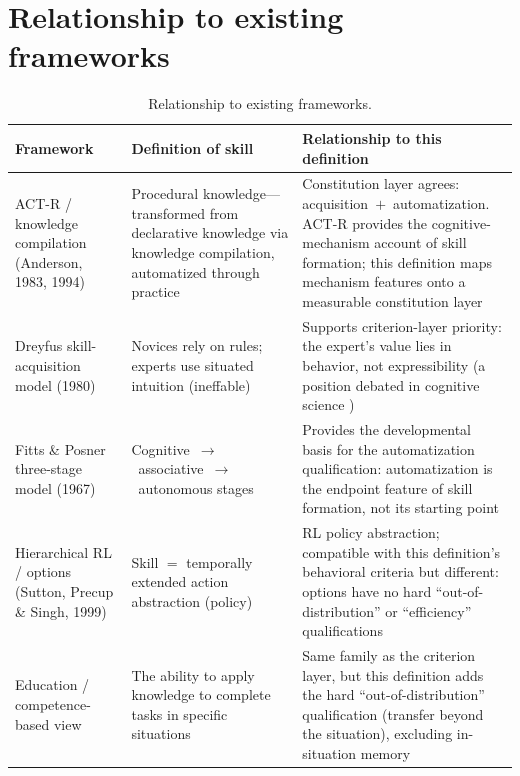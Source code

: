 \documentclass[11pt]{article}
\begin{document}
\section{Relationship to existing frameworks}
\label{sec:frameworks}

\begin{table}[h]
\centering
\begin{tabular}{@{}p{}p{}p{}@{}}
\toprule
Framework & Definition of skill & Relationship to this definition \\
\midrule
ACT-R / knowledge compilation (Anderson, 1983, 1994) \cite{anderson1983,anderson1994} & Procedural knowledge---transformed from declarative knowledge via knowledge compilation, automatized through practice & Constitution layer agrees: acquisition~$+$~automatization. ACT-R provides the cognitive-mechanism account of skill formation; this definition maps mechanism features onto a measurable constitution layer \\
\addlinespace
Dreyfus skill-acquisition model (1980) \cite{dreyfus1980} & Novices rely on rules; experts use situated intuition (ineffable) & Supports criterion-layer priority: the expert's value lies in behavior, not expressibility (a position debated in cognitive science \cite{gobet2009}) \\
\addlinespace
Fitts \& Posner three-stage model (1967) \cite{fitts1967} & Cognitive~$\rightarrow$~associative~$\rightarrow$~autonomous stages & Provides the developmental basis for the automatization qualification: automatization is the endpoint feature of skill formation, not its starting point \\
\addlinespace
Hierarchical RL / options (Sutton, Precup \& Singh, 1999) \cite{sutton1999} & Skill $=$ temporally extended action abstraction (policy) & RL policy abstraction; compatible with this definition's behavioral criteria but different: options have no hard ``out-of-distribution'' or ``efficiency'' qualifications \\
\addlinespace
Education / competence-based view & The ability to apply knowledge to complete tasks in specific situations & Same family as the criterion layer, but this definition adds the hard ``out-of-distribution'' qualification (transfer beyond the situation), excluding in-situation memory \\
\bottomrule
\end{tabular}
\caption{Relationship to existing frameworks.}
\label{tab:frameworks}
\end{table}
\end{document}
